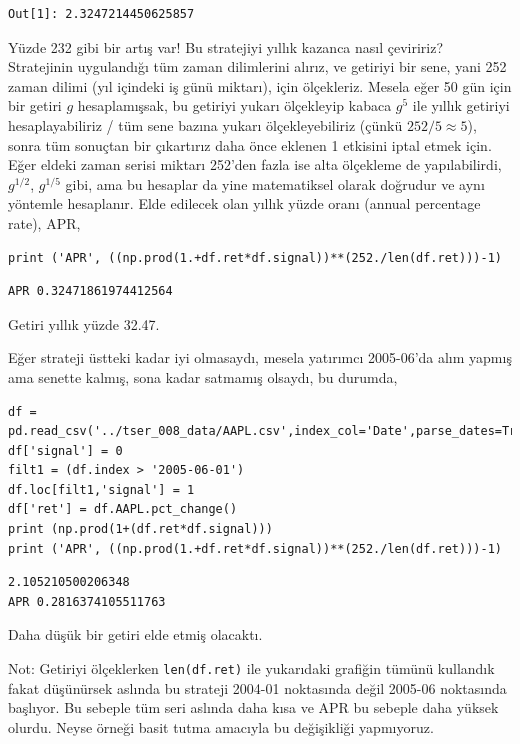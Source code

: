 \documentclass[12pt,fleqn]{article}\usepackage{../../common}
\begin{document}
\begin{verbatim}
Out[1]: 2.3247214450625857
\end{verbatim}

Yüzde 232 gibi bir artış var! Bu stratejiyi yıllık kazanca nasıl çeviririz?
Stratejinin uygulandığı tüm zaman dilimlerini alırız, ve getiriyi bir sene, yani
252 zaman dilimi (yıl içindeki iş günü miktarı), için ölçekleriz. Mesela eğer 50
gün için bir getiri $g$ hesaplamışsak, bu getiriyi yukarı ölçekleyip kabaca
$g^5$ ile yıllık getiriyi hesaplayabiliriz / tüm sene bazına yukarı
ölçekleyebiliriz (çünkü $252/5 \approx 5$), sonra tüm sonuçtan bir çıkartırız
daha önce eklenen 1 etkisini iptal etmek için. Eğer eldeki zaman serisi miktarı
252'den fazla ise alta ölçekleme de yapılabilirdi, $g^{1/2}$, $g^{1/5}$ gibi,
ama bu hesaplar da yine matematiksel olarak doğrudur ve aynı yöntemle
hesaplanır. Elde edilecek olan yıllık yüzde oranı (annual percentage rate), APR,

\begin{verbatim}
print ('APR', ((np.prod(1.+df.ret*df.signal))**(252./len(df.ret)))-1)
\end{verbatim}

\begin{verbatim}
APR 0.32471861974412564
\end{verbatim}

Getiri yıllık yüzde 32.47.

Eğer strateji üstteki kadar iyi olmasaydı, mesela yatırımcı 2005-06'da
alım yapmış ama senette kalmış, sona kadar satmamış olsaydı, bu durumda,

\begin{verbatim}
df = pd.read_csv('../tser_008_data/AAPL.csv',index_col='Date',parse_dates=True)
df['signal'] = 0
filt1 = (df.index > '2005-06-01')
df.loc[filt1,'signal'] = 1
df['ret'] = df.AAPL.pct_change()
print (np.prod(1+(df.ret*df.signal)))
print ('APR', ((np.prod(1.+df.ret*df.signal))**(252./len(df.ret)))-1)
\end{verbatim}

\begin{verbatim}
2.105210500206348
APR 0.2816374105511763
\end{verbatim}

Daha düşük bir getiri elde etmiş olacaktı.

Not: Getiriyi ölçeklerken \verb!len(df.ret)! ile yukarıdaki grafiğin tümünü
kullandık fakat düşünürsek aslında bu strateji 2004-01 noktasında değil 2005-06
noktasında başlıyor. Bu sebeple tüm seri aslında daha kısa ve APR bu sebeple
daha yüksek olurdu. Neyse örneği basit tutma amacıyla bu değişikliği yapmıyoruz.
\end{document}
